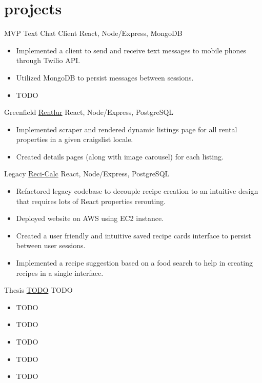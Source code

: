 
\section{projects}

\begin{entrylist}


\entry
{MVP}
{Text Chat Client}
{React, Node/Express, MongoDB}
{\begin{itemize}
\item Implemented a client to send and receive text messages to mobile phones through Twilio API.  
\item Utilized MongoDB to persist messages between sessions. 
\item TODO

\end{itemize}}


\entry
{Greenfield}
{\href{http://gadflyzone.com/}{Rentlur}}
{React, Node/Express, PostgreSQL}
{\begin{itemize}
\item Implemented scraper and rendered dynamic listings page for all rental properties in a given craigslist locale. 
\item Created details pages (along with image carousel) for each listing.
\end{itemize}}


\entry
{Legacy}
{\href{https://narrativescience.com/}{Reci-Calc}}
{React, Node/Express, PostgreSQL}
{\begin{itemize}
\item Refactored legacy codebase to decouple recipe creation to an intuitive design that requires lots of React properties rerouting.  
\item Deployed website on AWS using EC2 instance. 
\item Created a user friendly and intuitive saved recipe cards interface to persist between user sessions. 
\item Implemented a recipe suggestion based on a food search to help in creating recipes in a single interface. 
\end{itemize}}

\entry
{Thesis}
{\href{https://narrativescience.com/}{TODO}}
{TODO}
{\begin{itemize}
\item TODO
\item TODO
\item TODO
\item TODO
\item TODO 
\end{itemize}}

\end{entrylist}
